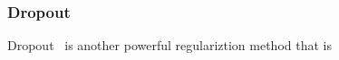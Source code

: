 \subsubsection{Dropout}

Dropout~\cite{JMLR:v15:srivastava14a} is another powerful regulariztion method that is